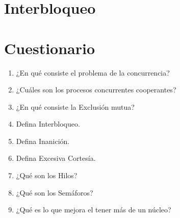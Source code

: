 \documentclass[12pt, a4paper]{article} %
\begin{document}
\clearpage
\tableofcontents

	

\clearpage
\section{Interbloqueo}

\clearpage
\section{Cuestionario}

\begin{enumerate}
	\item ¿En qué consiste el problema de la concurrencia?



	\item ¿Cuáles son los procesos concurrentes cooperantes?



	\item ¿En qué consiste la Exclusión mutua?



	\item Defina Interbloqueo.



	\item Defina Inanición.



	\item Defina Excesiva Cortesía.



	\item ¿Qué son los Hilos?



	\item ¿Qué son los Semáforos?



	\item ¿Qué es lo que mejora el tener más de un núcleo?

	
\end{enumerate}


\nocite{*} %

\clearpage


\end{document}
